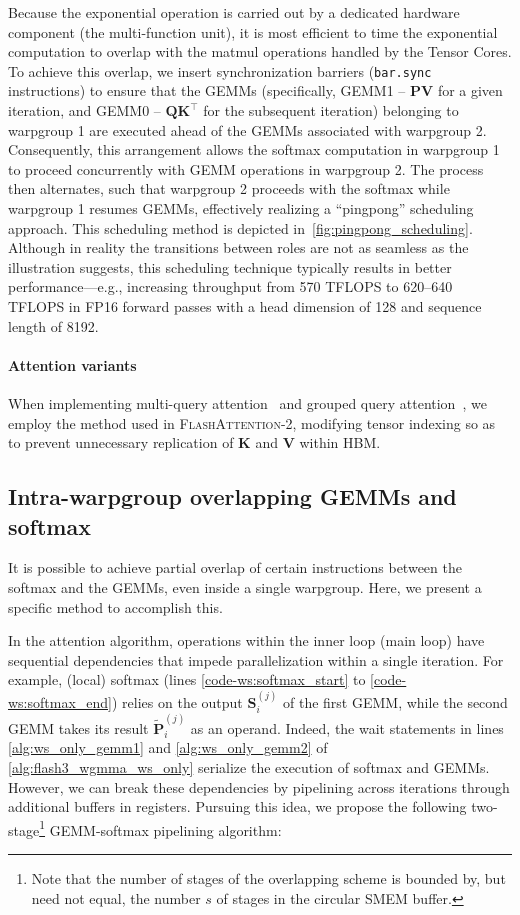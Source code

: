 Because the exponential operation is carried out by a dedicated hardware component (the multi-function unit), it is most efficient to time the exponential computation to overlap with the matmul operations handled by the Tensor Cores. To achieve this overlap, we insert synchronization barriers (\texttt{bar.sync} instructions) to ensure that the GEMMs (specifically, GEMM1 -- $\mathbf{P} \mathbf{V}$ for a given iteration, and GEMM0 -- $\mathbf{Q} \mathbf{K}^\top$
for the subsequent iteration) belonging to warpgroup 1 are executed ahead of the GEMMs associated with warpgroup 2. Consequently, this arrangement allows the softmax computation in warpgroup 1 to proceed concurrently with GEMM operations in warpgroup 2. The process then alternates, such that warpgroup 2 proceeds with the softmax while warpgroup 1 resumes GEMMs, effectively realizing a ``pingpong'' scheduling approach. This scheduling method is depicted in~\cref{fig:pingpong_scheduling}. Although in reality the transitions between roles are not as seamless as the illustration suggests, this scheduling technique typically results in better performance—e.g., increasing throughput from 570 TFLOPS to 620–640 TFLOPS in FP16 forward passes with a head dimension of 128 and sequence length of 8192.

\paragraph{Attention variants} When implementing multi-query attention~\citep{shazeer2019fast} and grouped query attention~\citep{ainslie2023gqa}, we employ the method used in \textsc{FlashAttention-2}, modifying tensor indexing so as to prevent unnecessary replication of $\mathbf{K}$ and $\mathbf{V}$ within HBM.

\subsection{Intra-warpgroup overlapping GEMMs and softmax}

It is possible to achieve partial overlap of certain instructions between the softmax and the GEMMs, even inside a single warpgroup. Here, we present a specific method to accomplish this.

In the attention algorithm, operations within the inner loop (main loop) have sequential dependencies that impede parallelization within a single iteration. For example, (local) softmax (lines \ref{code-ws:softmax_start} to \ref{code-ws:softmax_end}) relies on the output $\mathbf{S}_i^{(j)}$ of the first GEMM, while the second GEMM takes its result $\widetilde{\mathbf{P}}_i^{(j)}$ as an operand. Indeed, the wait statements in lines \ref{alg:ws_only_gemm1} and \ref{alg:ws_only_gemm2} of \cref{alg:flash3_wgmma_ws_only} serialize the execution of softmax and GEMMs. However, we can break these dependencies by pipelining across iterations through additional buffers in registers. Pursuing this idea, we propose the following two-stage\footnote{Note that the number of stages of the overlapping scheme is bounded by, but need not equal, the number $s$ of stages in the circular SMEM buffer.} GEMM-softmax pipelining algorithm:

